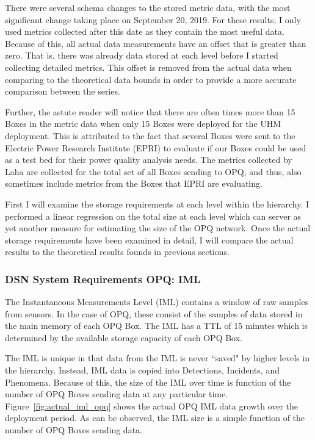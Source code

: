 There were several schema changes to the stored metric data, with the most significant change taking place on September 20, 2019. For these results, I only used metrics collected after this date as they contain the most useful data. Because of this, all actual data measurements have an offset that is greater than zero. That is, there was already data stored at each level before I started collecting detailed metrics. This offset is removed from the actual data when comparing to the theoretical data bounds in order to provide a more accurate comparison between the series.

Further, the astute reader will notice that there are often times more than 15 Boxes in the metric data when only 15 Boxes were deployed for the UHM deployment. This is attributed to the fact that several Boxes were sent to the Electric Power Research Institute (EPRI) to evaluate if our Boxes could be used as a test bed for their power quality analysis needs. The metrics collected by Laha are collected for the total set of all Boxes sending to OPQ, and thus, also sometimes include metrics from the Boxes that EPRI are evaluating.

First I will examine the storage requirements at each level within the hierarchy. I performed a linear regression on the total size at each level which can server as yet another measure for estimating the size of the OPQ network. Once the actual storage requirements have been examined in detail, I will compare the actual results to the theoretical results founds in previous sections.

\subsubsection{DSN System Requirements OPQ: IML}

The Instantaneous Measurements Level (IML) contains a window of raw samples from sensors. In the case of OPQ, these consist of the samples of data stored in the main memory of each OPQ Box. The IML has a TTL of 15 minutes which is determined by the available storage capacity of each OPQ Box.

The IML is unique in that data from the IML is never ``saved" by higher levels in the hierarchy. Instead, IML data is copied into Detections, Incidents, and Phenomena. Because of this, the size of the IML over time is function of the number of OPQ Boxes sending data at any particular time. Figure~\ref{fig:actual_iml_opq} shows the actual OPQ IML data growth over the deployment period. As can be observed, the IML size is a simple function of the number of OPQ Boxes sending data.


